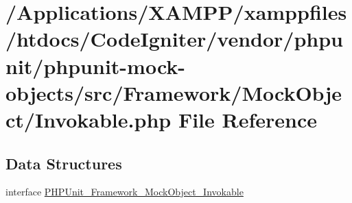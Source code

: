 \hypertarget{_invokable_8php}{}\section{/\+Applications/\+X\+A\+M\+P\+P/xamppfiles/htdocs/\+Code\+Igniter/vendor/phpunit/phpunit-\/mock-\/objects/src/\+Framework/\+Mock\+Object/\+Invokable.php File Reference}
\label{_invokable_8php}
\subsection*{Data Structures}
\begin{DoxyCompactItemize}
\item 
interface \mbox{\hyperlink{interface_p_h_p_unit___framework___mock_object___invokable}{P\+H\+P\+Unit\+\_\+\+Framework\+\_\+\+Mock\+Object\+\_\+\+Invokable}}
\end{DoxyCompactItemize}
